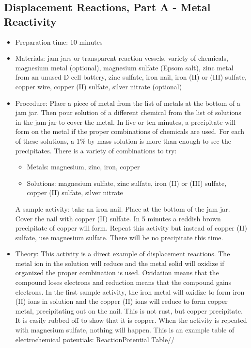 \subsection{Displacement Reactions, Part A - Metal Reactivity}
\begin{itemize}
\item{Preparation time: 10 minutes}
\item{Materials: jam jars or transparent reaction vessels, variety of chemicals, magnesium metal (optional), magnesium sulfate (Epsom salt), zinc metal from an unused D cell battery, zinc sulfate, iron nail, iron (II) or (III) sulfate, copper wire, copper (II) sulfate, silver nitrate (optional)}
\item{Procedure: Place a piece of metal from the list of metals at the bottom of a jam jar. Then pour solution of a different chemical from the list of solutions in the jam jar to cover the metal. In five or ten minutes, a precipitate will form on the metal if the proper combinations of chemicals are used. For each of these solutions, a 1\% by mass solution is more than enough to see the precipitates. There is a variety of combinations to try:
\begin{itemize}
\item{Metals: magnesium, zinc, iron, copper}
\item{Solutions: magnesium sulfate, zinc sulfate, iron (II) or (III) sulfate, copper (II) sulfate, silver nitrate}
\end{itemize}
A sample activity: take an iron nail. Place at the bottom of the jam jar. Cover the nail with copper (II) sulfate. In 5 minutes a reddish brown precipitate of copper will form. Repeat this activity but instead of copper (II) sulfate, use magnesium sulfate. There will be no precipitate this time.}
\item{Theory: This activity is a direct example of displacement reactions. The metal ion in the solution will reduce and the metal solid will oxidize if organized the proper combination is used. Oxidation means that the compound loses electrons and reduction means that the compound gains electrons. In the first sample activity, the iron metal will oxidize to form iron (II) ions in solution and the copper (II) ions will reduce to form copper metal, precipitating out on the nail. This is not rust, but copper precipitate. It is easily rubbed off to show that it is copper. When the activity is repeated with magnesium sulfate, nothing will happen. This is an example table of electrochemical potentials: ReactionPotential Table//
}
\end{itemize}
